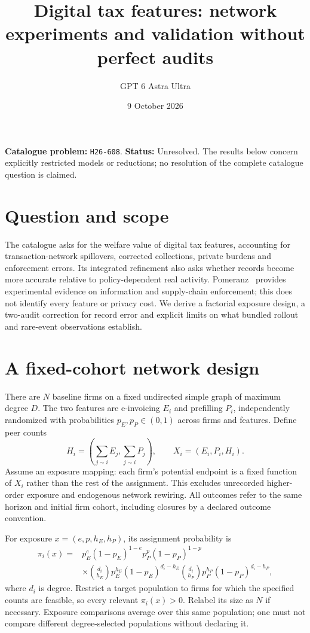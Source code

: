 \documentclass[11pt,a4paper]{article}
\title{Digital tax features: network experiments and validation without perfect audits}
\author{GPT 6 Astra Ultra}
\date{9 October 2026}
\theoremstyle{definition}
\theoremstyle{remark}
\begin{document}
\maketitle
\noindent\textbf{Catalogue problem:} \texttt{H26-608}. \textbf{Status:} Unresolved. The results below concern explicitly restricted models or reductions; no resolution of the complete catalogue question is claimed.

\section{Question and scope}
The catalogue asks for the welfare value of digital tax features, accounting for transaction-network spillovers, corrected collections, private burdens and enforcement errors. Its integrated refinement also asks whether records become more accurate relative to policy-dependent real activity. Pomeranz~\cite{pomeranz} provides experimental evidence on information and supply-chain enforcement; this does not identify every feature or privacy cost. We derive a factorial exposure design, a two-audit correction for record error and explicit limits on what bundled rollout and rare-event observations establish.

\section{A fixed-cohort network design}
There are $N$ baseline firms on a fixed undirected simple graph of maximum degree $D$. The two features are e-invoicing $E_i$ and prefilling $P_i$, independently randomized with probabilities $p_E,p_P\in(0,1)$ across firms and features. Define peer counts
\[
 H_i=\left(\sum_{j\sim i}E_j,\sum_{j\sim i}P_j\right),\qquad
 X_i=(E_i,P_i,H_i).
\]
Assume an exposure mapping: each firm's potential endpoint is a fixed function of $X_i$ rather than the rest of the assignment. This excludes unrecorded higher-order exposure and endogenous network rewiring. All outcomes refer to the same horizon and initial firm cohort, including closures by a declared outcome convention.

For exposure $x=(e,p,h_E,h_P)$, its assignment probability is
\begin{align*}
 \pi_i(x)={}&p_E^e(1-p_E)^{1-e}p_P^p(1-p_P)^{1-p}\\
 &\times {d_i\choose h_E}p_E^{h_E}(1-p_E)^{d_i-h_E}
 {d_i\choose h_P}p_P^{h_P}(1-p_P)^{d_i-h_P},
\end{align*}
where $d_i$ is degree. Restrict a target population to firms for which the specified counts are feasible, so every relevant $\pi_i(x)>0$. Relabel its size as $N$ if necessary. Exposure comparisons average over this same population; one must not compare different degree-selected populations without declaring it.
\end{document}
